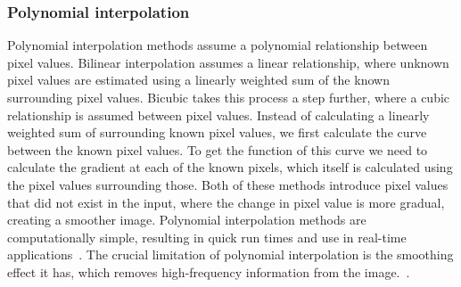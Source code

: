 \subsubsection{Polynomial interpolation}
Polynomial interpolation methods assume a polynomial relationship between pixel values. Bilinear interpolation assumes a linear relationship, where unknown pixel values are estimated using a linearly weighted sum of the known surrounding pixel values. Bicubic takes this process a step further, where a cubic relationship is assumed between pixel values. Instead of calculating a linearly weighted sum of surrounding known pixel values, we first calculate the curve between the known pixel values. To get the function of this curve we need to calculate the gradient at each of the known pixels, which itself is calculated using the pixel values surrounding those. Both of these methods introduce pixel values that did not exist in the input, where the change in pixel value is more gradual, creating a smoother image. Polynomial interpolation methods are computationally simple, resulting in quick run times and use in real-time applications~\cite{interpolation}. The crucial limitation of polynomial interpolation is the smoothing effect it has, which removes high-frequency information from the image.~\cite{interpolation}.

